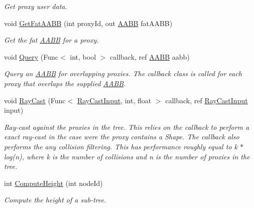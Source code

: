 \begin{DoxyCompactItemize}
\begin{DoxyCompactList}\small\item\em Get proxy user data. \end{DoxyCompactList}\item 
void \hyperlink{class_farseer_physics_1_1_collision_1_1_dynamic_tree_3_01_t_01_4_a2c9bc07f063875079a97ec41576076bb}{Get\+Fat\+A\+A\+B\+B} (int proxy\+Id, out \hyperlink{struct_farseer_physics_1_1_collision_1_1_a_a_b_b}{A\+A\+B\+B} fat\+A\+A\+B\+B)
\begin{DoxyCompactList}\small\item\em Get the fat \hyperlink{struct_farseer_physics_1_1_collision_1_1_a_a_b_b}{A\+A\+B\+B} for a proxy. \end{DoxyCompactList}\item 
void \hyperlink{class_farseer_physics_1_1_collision_1_1_dynamic_tree_3_01_t_01_4_a1f4cf8c48e5aea829882996940887143}{Query} (Func$<$ int, bool $>$ callback, ref \hyperlink{struct_farseer_physics_1_1_collision_1_1_a_a_b_b}{A\+A\+B\+B} aabb)
\begin{DoxyCompactList}\small\item\em Query an \hyperlink{struct_farseer_physics_1_1_collision_1_1_a_a_b_b}{A\+A\+B\+B} for overlapping proxies. The callback class is called for each proxy that overlaps the supplied \hyperlink{struct_farseer_physics_1_1_collision_1_1_a_a_b_b}{A\+A\+B\+B}. \end{DoxyCompactList}\item 
void \hyperlink{class_farseer_physics_1_1_collision_1_1_dynamic_tree_3_01_t_01_4_a7419b94a2dfd08642eb4607f8d91bada}{Ray\+Cast} (Func$<$ \hyperlink{struct_farseer_physics_1_1_collision_1_1_ray_cast_input}{Ray\+Cast\+Input}, int, float $>$ callback, ref \hyperlink{struct_farseer_physics_1_1_collision_1_1_ray_cast_input}{Ray\+Cast\+Input} input)
\begin{DoxyCompactList}\small\item\em Ray-\/cast against the proxies in the tree. This relies on the callback to perform a exact ray-\/cast in the case were the proxy contains a Shape. The callback also performs the any collision filtering. This has performance roughly equal to k $\ast$ log(n), where k is the number of collisions and n is the number of proxies in the tree. \end{DoxyCompactList}\item 
int \hyperlink{class_farseer_physics_1_1_collision_1_1_dynamic_tree_3_01_t_01_4_a73b99cdcd39b41b90053e30adcf8626b}{Compute\+Height} (int node\+Id)
\begin{DoxyCompactList}\small\item\em Compute the height of a sub-\/tree. \end{DoxyCompactList}\item 

\end{DoxyCompactItemize}
